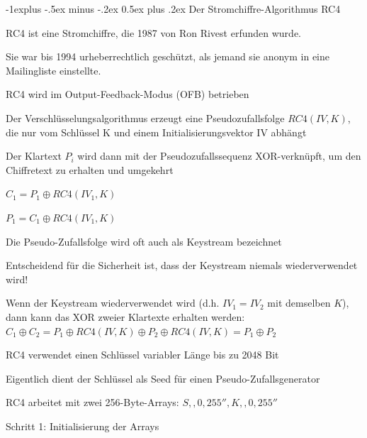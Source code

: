 \documentclass[a4paper]{article}
\makeatletter
\renewcommand{\subsection}{\@startsection{subsection}{2}{0mm}%
 {-1explus -.5ex minus -.2ex}%
 {0.5ex plus .2ex}%
 {\normalfont\normalsize\bfseries}}
\makeatother
\begin{document}
\begin{multicols}{3}
      \subsection{Der Stromchiffre-Algorithmus RC4}
      \begin{itemize*}
            \item RC4 ist eine Stromchiffre, die 1987 von Ron Rivest erfunden wurde.
            \item Sie war bis 1994 urheberrechtlich geschützt, als jemand sie anonym in
            eine Mailingliste einstellte.
            \item RC4 wird im Output-Feedback-Modus (OFB) betrieben
            \begin{itemize*}
                  \item Der Verschlüsselungsalgorithmus erzeugt eine Pseudozufallsfolge $RC4(IV,K)$, die nur vom Schlüssel K und einem Initialisierungsvektor IV abhängt
                  \item Der Klartext $P_i$ wird dann mit der Pseudozufallssequenz XOR-verknüpft, um den Chiffretext zu erhalten und umgekehrt
                  \begin{itemize*}
                        \item $C_1 = P_1\oplus RC4 (IV_1,K)$
                        \item $P_1 = C_1\oplus RC4 (IV_1,K)$
                  \end{itemize*}
                  \item Die Pseudo-Zufallsfolge wird oft auch als Keystream bezeichnet
                  \item Entscheidend für die Sicherheit ist, dass der Keystream niemals wiederverwendet wird!
                  \item Wenn der Keystream wiederverwendet wird (d.h. $IV_1=IV_2$ mit demselben $K$), dann kann das XOR zweier Klartexte erhalten werden: $C_1\oplus C_2= P_1\oplus RC4(IV, K)\oplus P_2\oplus RC4(IV,K) = P_1\oplus P_2$
            \end{itemize*}
            \item RC4 verwendet einen Schlüssel variabler Länge bis zu 2048 Bit
            \item Eigentlich dient der Schlüssel als Seed für einen Pseudo-Zufallsgenerator
            \item RC4 arbeitet mit zwei 256-Byte-Arrays: $S,,0,255'', K,,0,255''$
            \begin{itemize*}
                  \item Schritt 1: Initialisierung der Arrays

\end{itemize*}
\end{itemize*}
\end{multicols}
\end{document}
